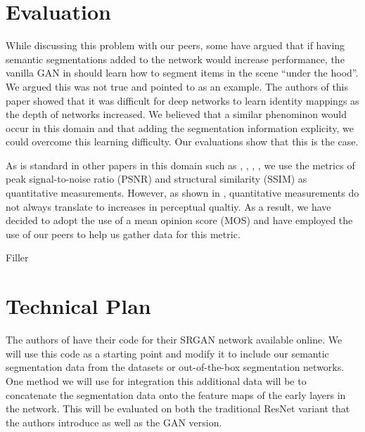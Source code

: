 \documentclass[10pt,twocolumn,letterpaper]{article}
\begin{document}
\section{Evaluation}
\label{sec:evaluation}
While discussing this problem with our peers, some have argued that if having
semantic segmentations added to the network would increase performance, the
vanilla GAN in \cite{SRGAN} should learn how to segment items in the scene
``under the hood''. We argued this was not true and pointed to \cite{ResNet} as
an example. The authors of this paper showed that it was difficult for deep
networks to learn identity mappings as the depth of networks increased. We
believed that a similar phenominon would occur in this domain and that adding
the segmentation information explicity, we could overcome this learning
difficulty. Our evaluations show that this is the case.

As is standard in other papers in this domain such as \cite{SRCNN},
\cite{SRGAN}, \cite{PerceptualLosses}, \cite{DeeplyRecursive}, we use the
metrics of peak signal-to-noise ratio (PSNR) and structural similarity (SSIM)
as quantitative measurements. However, as shown in \cite{SRGAN}, quantitative
measurements do not always translate to increases in perceptual qualtiy. As a
result, we have decided to adopt the use of a mean opinion score (MOS) and have
employed the use of our peers to help us gather data for this metric.

Filler


\section{Technical Plan}
The authors of \cite{SRGAN} have their code for their SRGAN network available
online. We will use this code as a starting point and modify it to include our
semantic segmentation data from the datasets or out-of-the-box segmentation
networks. One method we will use for integration this additional data will be
to concatenate the segmentation data onto the feature maps of the early layers
in the network. This will be evaluated on both the traditional ResNet variant
that the authors introduce as well as the GAN version.

\end{document}
